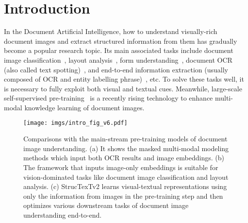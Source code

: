 \documentclass{article} %
\begin{document}
\section{Introduction}
In the Document Artificial Intelligence, how to understand visually-rich document images and extract structured information from them has gradually become a popular research topic. Its main associated tasks include document image classification~\cite{icdar15cdip}, layout analysis~\cite{zhong2019publaynet}, form understanding~\cite{jaume2019funsd}, document OCR (also called text spotting)~\cite{li2017towards,lyu2018mask}, and end-to-end information extraction (usually composed of OCR and entity labelling phrase)~\cite{WangLJT0ZWWC21}, etc. To solve these tasks well, it is necessary to fully exploit both visual and textual cues. Meanwhile, large-scale self-supervised pre-training~\cite{li2021structurallm,appalaraju2021docformer,xu2020layoutlm,xu2020layoutlmv2,huang2022layoutlmv3,nips2021udoc} is a recently rising technology to enhance multi-modal knowledge learning of document images.

\begin{figure*}
 \centering
 \texttt{[image: imgs/intro\_fig\_v6.pdf]}
\caption{Comparisons with the main-stream pre-training models of document image understanding. (a) It shows the masked multi-modal modeling methods which input both OCR results and image embeddings. (b) The framework that inputs image-only embeddings is suitable for vision-dominated tasks like document image classification and layout analysis. (c) StrucTexTv2 learns visual-textual representations using only the information from images in the pre-training step and then optimizes various downstream tasks of document image understanding end-to-end.}
\label{fig:intro_arch}
\vspace{-1em}
\end{figure*}
\end{document}
